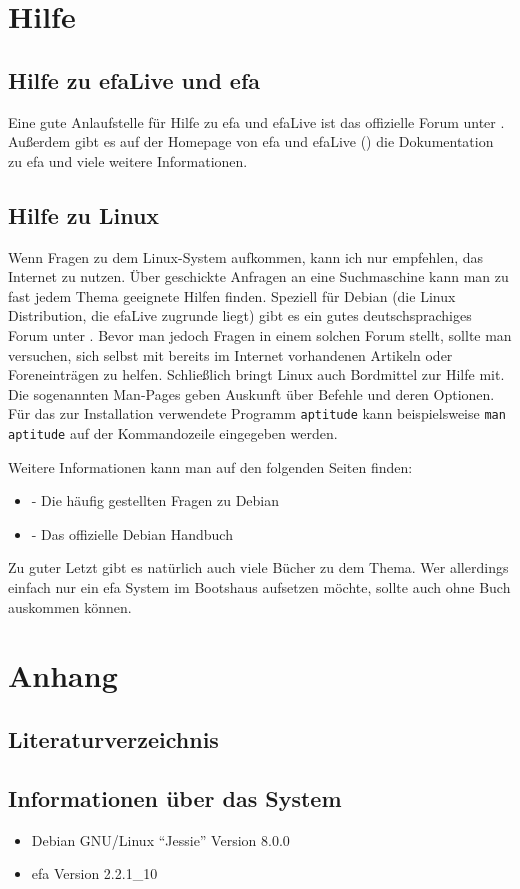 \documentclass[a4paper,12pt,twoside]{article}
\begin{document}
\section{Hilfe}
\label{sct:hilfe}
\subsection{Hilfe zu efaLive und efa}
\label{sct:hilfe_efa}
Eine gute Anlaufstelle für Hilfe zu efa und efaLive ist das offizielle
Forum unter \cite{EFA3}. Außerdem gibt es auf der Homepage von efa und
efaLive (\cite{EFA1}\cite{EFA4}\cite{EFA5}) die Dokumentation zu efa
und viele weitere Informationen.


\subsection{Hilfe zu Linux}
\label{sct:hilfe_linux}
Wenn Fragen zu dem Linux-System aufkommen, kann ich nur empfehlen, das
Internet zu nutzen. Über geschickte Anfragen an eine Suchmaschine kann
man zu fast jedem Thema geeignete Hilfen finden. Speziell für Debian
(die Linux Distribution, die efaLive zugrunde liegt) gibt es ein gutes
deutschsprachiges Forum unter \cite{HLP1}. Bevor man jedoch Fragen in
einem solchen Forum stellt, sollte man versuchen, sich selbst mit
bereits im Internet vorhandenen Artikeln oder Foreneinträgen zu helfen.
Schließlich bringt Linux auch Bordmittel zur Hilfe mit. Die sogenannten
Man-Pages geben Auskunft über Befehle und deren Optionen. Für das zur
Installation verwendete Programm \texttt{aptitude}
kann beispielsweise \texttt{man aptitude} auf der
Kommandozeile eingegeben werden.

Weitere Informationen kann man auf den folgenden Seiten finden:

\begin{itemize}
    \item \cite{HLP2} - Die häufig gestellten Fragen zu Debian
    \item \cite{HLP3} - Das offizielle Debian Handbuch
\end{itemize}

Zu guter Letzt gibt es natürlich auch viele Bücher zu dem Thema. Wer
allerdings einfach nur ein efa System im Bootshaus aufsetzen möchte,
sollte auch ohne Buch auskommen können.


\clearpage
\section{Anhang}
\label{sct:anhang}
\subsection{Literaturverzeichnis}
\label{sct:literatur}




\subsection{Informationen über das System}
\label{sct:sysinfo}

\begin{itemize}
    \item Debian GNU/Linux "`Jessie"' Version 8.0.0
    \item efa Version 2.2.1\_10
\end{itemize}
\end{document}
